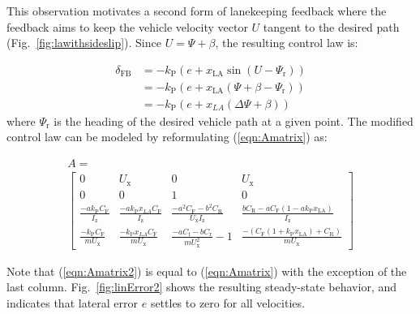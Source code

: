 \documentclass[10pt,a4paper]{article}
\begin{document}
This observation motivates a second form of lanekeeping feedback where the feedback aims to keep the 
vehicle velocity vector $U$ tangent to the desired path (Fig.~\ref{fig:lawithsideslip}). Since
 $U=\Psi+\beta$, the resulting control law is:
 
 
\begin{subequations}
\label{eqn:vveq}
\begin{align}
        \delta_\mathrm{FB} & = -k_\mathrm{P} (e+x_\mathrm{LA}  \sin⁡(U-\Psi_\mathrm{r} ) ) \\
                           & =  -k_\mathrm{P} (e+x_\mathrm{LA} (\Psi+\beta-\Psi_\mathrm{r} )) \\
						   & = -k_\mathrm{P}(e+x_{LA}(\Delta\Psi+\beta))
\end{align}
\end{subequations}
 where $\Psi_\mathrm{r}$ is the heading of the desired vehicle path at a given point. The modified control law can be modeled by reformulating (\ref{eqn:Amatrix}) as:
 
\begin{multline}
\label{eqn:Amatrix2}
A  =  \\
 \left[\begin{smallmatrix}
  0 & U_\mathrm{x} & 0 & U_\mathrm{x} \\
  0 & 0 & 1 & 0 \\
  \frac{-ak_\mathrm{P} C_\mathrm{F}}{I_\mathrm{z}}  & \frac{-ak_\mathrm{P}x_{LA}C_\mathrm{F}}{I_\mathrm{z}}  & \frac{-a^2C_\mathrm{F}-b^2C_\mathrm{R}}{U_\mathrm{x}I_\mathrm{z}} & \frac{bC_\mathrm{R} - aC_\mathrm{F}(1-ak_\mathrm{P}x_\mathrm{LA}) }{I_\mathrm{z}}  \\
  \frac{-k_\mathrm{P}C_\mathrm{F}}{mU_\mathrm{x}}  & \frac{-k_\mathrm{P}x_{LA}C_\mathrm{F}}{mU_\mathrm{x}}  & \frac{-aC_\mathrm{f}-bC_\mathrm{r}}{mU_\mathrm{x}^2}-1 & \frac{-(C_\mathrm{F}(1+k_\mathrm{P}x_\mathrm{LA}) + C_\mathrm{R})}{mU_\mathrm{x}}
 \end{smallmatrix}\right]
 \end{multline}
 
Note that (\ref{eqn:Amatrix2}) is equal to (\ref{eqn:Amatrix}) with the exception of the last column. Fig.~\ref{fig:linError2}
shows the resulting steady-state behavior, and indicates that lateral error $e$ settles to
zero for all velocities. 
\end{document}
